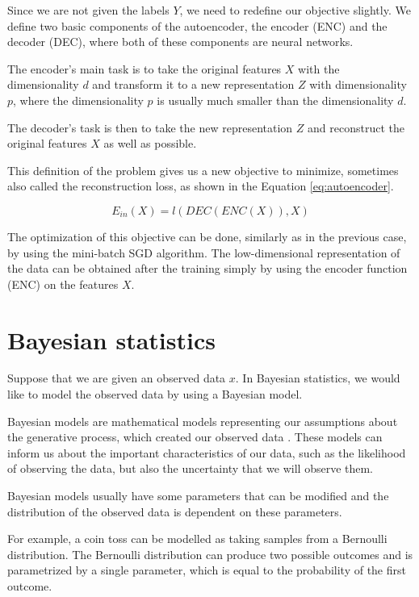 Since we are not given the labels $Y$, we need to redefine our objective slightly.
We define two basic components of the autoencoder, the encoder (ENC) and the decoder (DEC), where both of these components are neural networks.

The encoder's main task is to take the original features $X$ with the dimensionality $d$ and transform it to a new representation $Z$ with dimensionality $p$, where the dimensionality $p$ is usually much smaller than the dimensionality $d$.

The decoder's task is then to take the new representation $Z$ and reconstruct the original features $X$ as well as possible.

This definition of the problem gives us a new objective to minimize, sometimes also called the reconstruction loss, as shown in the Equation \ref{eq:autoencoder}.

\begin{equation}
    E_{in}(X) = l(DEC(ENC(X)), X)
    \label{eq:autoencoder}
\end{equation}

The optimization of this objective can be done, similarly as in the previous case, by using the mini-batch SGD algorithm.
The low-dimensional representation of the data can be obtained after the training simply by using the encoder function (ENC) on the features $X$.

\newpage
\section{Bayesian statistics}
\label{sec:bayes}
Suppose that we are given an observed data $x$.
In Bayesian statistics, we would like to model the observed data by using a Bayesian model.

Bayesian models are mathematical models representing our assumptions about the generative process, which created our observed data \cite{mcelreath2018statistical}.
These models can inform us about the important characteristics of our data, such as the likelihood of observing the data, but also the uncertainty that we will observe them.

Bayesian models usually have some parameters that can be modified and the distribution of the observed data is dependent on these parameters.

For example, a coin toss can be modelled as taking samples from a Bernoulli distribution.
The Bernoulli distribution can produce two possible outcomes and is parametrized by a single parameter, which is equal to the probability of the first outcome. 

